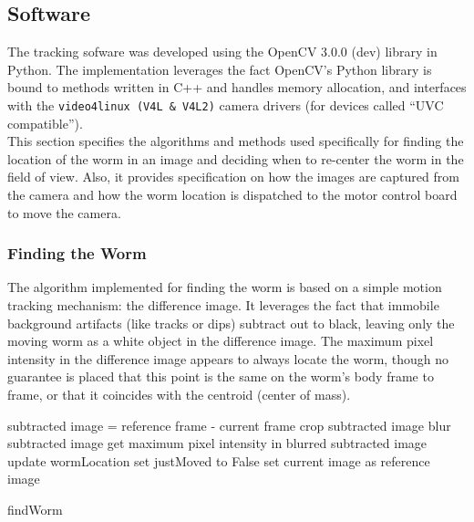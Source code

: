 \documentclass[main.tex]{subfiles}
\begin{document}
\subsection{Software}
The tracking sofware was developed using the OpenCV 3.0.0 (dev) library \cite{OpenCV} in Python. The implementation leverages the fact OpenCV's Python library is bound to methods written in C++ and handles memory allocation, and interfaces with the \verb|video4linux (V4L & V4L2)| camera drivers (for devices called ``UVC compatible''). \\

This section specifies the algorithms and methods used specifically for finding the location of the worm in an image and deciding when to re-center the worm in the field of view. Also, it provides specification on how the images are captured from the camera and how the worm location is dispatched to the motor control board to move the camera.

\subsubsection{Finding the Worm}
The algorithm implemented for finding the worm is based on a simple motion tracking mechanism: the difference image. It leverages the fact that immobile background artifacts (like tracks or dips) subtract out to black, leaving only the moving worm as a white object in the difference image. The maximum pixel intensity in the difference image appears to always locate the worm, though no guarantee is placed that this point is the same on the worm's body frame to frame, or that it coincides with the centroid (center of mass). \\


\begin{algorithm}[h]
    {
        {
            subtracted image = reference frame - current frame\;
            {
                crop subtracted image\;
            }
            {        
                blur subtracted image\;
                get maximum pixel intensity in blurred subtracted image\;
                update wormLocation\;
                set justMoved to False\;
            }   
    }{
    set current image as reference image\;}
}
\caption{findWorm}
\end{algorithm}
\end{document}
